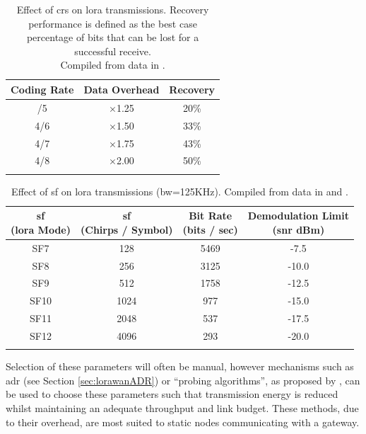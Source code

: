 \begin{table}
\centering\small
\caption[Effect of \ac{cr}s on \ac{lora} transmissions]{Effect of \ac{cr}s on \ac{lora} transmissions. Recovery performance is defined as the best case percentage of bits that can be lost for a successful receive. \\ Compiled from data in \cite{3YP:LORA_PERFORMANCE}.}
\label{cr_effect}
\begin{tabular}{c|cc}
    \toprule
    \textbf{Coding Rate} & \textbf{Data Overhead} & \textbf{Recovery}  \\
    \midrule\addlinespace
    4/5 & $\times$1.25 & 20\% \\
    4/6 & $\times$1.50 & 33\% \\
    4/7 & $\times$1.75 & 43\% \\
    4/8 & $\times$2.00 & 50\% \\
    \addlinespace\bottomrule
\end{tabular}
\end{table}

\begin{table}
\centering\small
\caption[Effect of \ac{sf} on \ac{lora} transmissions]{Effect of \ac{sf} on \ac{lora} transmissions (\ac{bw}=125KHz). Compiled from data in \cite{3YP:LORA_MOD_BASICS} and \cite{3YP:LORA_PERFORMANCE}.}
\begin{tabular}{c|ccc}
    \toprule
    \makecell{\textbf{\ac{sf}} \\ \textbf{(\ac{lora} Mode)}} & \makecell{\textbf{\ac{sf}} \\ \textbf{(Chirps / Symbol)}} & \makecell{\textbf{Bit Rate} \\ \textbf{(bits / sec)}} & \makecell{\textbf{Demodulation Limit} \\ \textbf{(\ac{snr} dBm)}} \\
    \midrule\addlinespace
    SF7 & 128 & 5469 & -7.5 \\
    SF8 & 256 & 3125 & -10.0 \\
    SF9 & 512 & 1758 & -12.5 \\
    SF10 & 1024 & 977 & -15.0 \\
    SF11 & 2048 & 537 & -17.5 \\
    SF12 & 4096 & 293 & -20.0 \\
    \addlinespace\bottomrule
\end{tabular}
\label{sf_effect}
\end{table}
Selection of these parameters will often be manual, however mechanisms such as \ac{adr} (see Section \ref{sec:lorawanADR}) or ``probing algorithms'', as proposed by \cite{3YP:CHOOSING_LORA_PARAMETERS}, can be used to choose these parameters such that transmission energy is reduced whilst maintaining an adequate throughput and link budget. These methods, due to their overhead, are most suited to static nodes communicating with a gateway.

